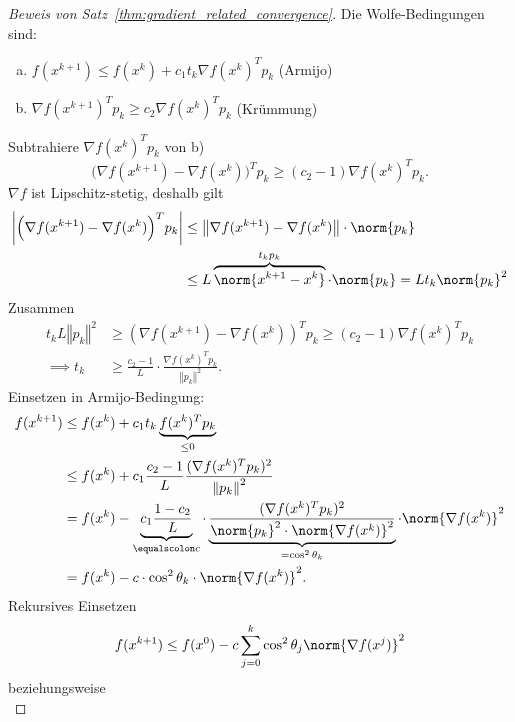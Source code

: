 \begin{proof}[Beweis von Satz~\ref{thm:gradient_related_convergence}]
Die Wolfe-Bedingungen sind:
\begin{enumerate}[a)]
 \item $f (x^{k+1} ) \leq f (x^k )+c_1t_k \nabla f (x^k )^Tp_k$ (Armijo)
 \item $\nabla f (x^{k+1})^T p_k \geq c_2 \nabla f (x^k )^Tp_k$ (Krümmung)
\end{enumerate}

Subtrahiere $\nabla f (x^k )^Tp_k$ von b)
\begin{equation*}
 \Big(\nabla f (x^{k+1} )-\nabla f (x^k ) \Big)^T p_k \geq (c_2-1) \nabla f (x^k )^Tp_k.
\end{equation*}
$\nabla f$ ist Lipschitz-stetig, deshalb gilt
\begin{align*}
 \left\vert \Big(\nabla f (x^{k+1} )-\nabla f (x^k ) \Big)^Tp_k \right\vert
 & \leq
 \left\Vert\nabla f (x^{k+1} )-\nabla f (x^k ) \right\Vert \cdot \norm{p_k} \\
& \leq
L \overbrace{\norm{x^{k+1}-x^k}}^{t_kp_k} \cdot \norm{p_k} =Lt_k \norm{p_k}^2
\end{align*}
Zusammen \begin{align*}
    t_kL \left\Vert p_k \right\Vert^2 & \geq (\nabla f (x^{k+1} )-\nabla f (x^k ) )^Tp_k \geq (c_2-1) \nabla f (x^k )^Tp_k \\
    \implies t_k & \geq \frac{c_2-1}{L} \cdot \frac{\nabla f (x^k )^T p_k}{\left\Vert p_k \right\Vert^2}.
\end{align*}
Einsetzen in Armijo-Bedingung:
\begin{align*}
    f (x^{k+1} ) & \leq f (x^k ) +c_1t_k \underbrace{f (x^k )^Tp_k}_{\leq 0} \\
    & \leq f (x^k )+c_1 \frac{c_2-1}{L} \frac{(\nabla f (x^k )^Tp_k )^2}{\left\Vert p_k \right\Vert^2} \\
    & = f (x^k )-\underbrace{c_1 \frac{1-c_2}{L}}_{\equalscolon c} \cdot \underbrace{\frac{(\nabla f (x^k )^Tp_k )^2}{\norm{p_k}^2 \cdot \norm{\nabla f(x^k)}^2}}_{=\cos^2 \theta_k} \cdot \norm{\nabla f(x^k)}^2 \\
    & = f (x^k )-c \cdot \cos^2 \theta_k \cdot \norm{\nabla f(x^k)}^2.
\end{align*}
Rekursives Einsetzen \begin{equation*}
    f (x^{k+1} ) \leq f (x^0 )-c \sum_{j=0}^k \cos^2 \theta_j \norm{ \nabla f(x^j) }^2
\end{equation*}
beziehungsweise
\begin{equation*}

\end{equation*}
\end{proof}
